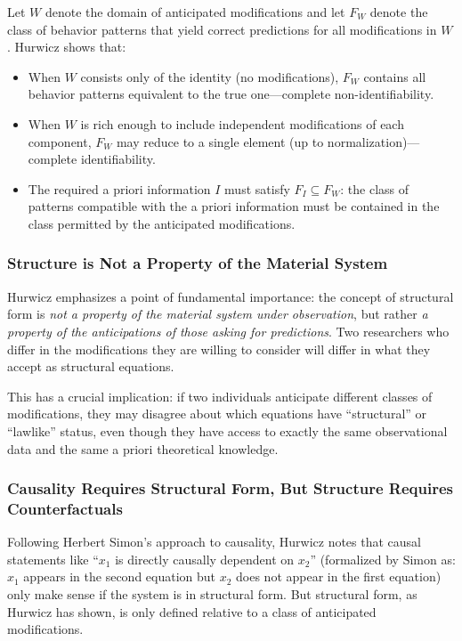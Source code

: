 \documentclass[12pt]{article}
\begin{document}
Let $W$ denote the domain of anticipated modifications and let $F_W$ denote the class of behavior patterns that yield correct predictions for all modifications in $W$. Hurwicz shows that:
\begin{itemize}
\item When $W$ consists only of the identity (no modifications), $F_W$ contains all behavior patterns equivalent to the true one---complete non-identifiability.
\item When $W$ is rich enough to include independent modifications of each component, $F_W$ may reduce to a single element (up to normalization)---complete identifiability.
\item The required a priori information $I$ must satisfy $F_I \subseteq F_W$: the class of patterns compatible with the a priori information must be contained in the class permitted by the anticipated modifications.
\end{itemize}

\subsubsection{Structure is Not a Property of the Material System}

Hurwicz emphasizes a point of fundamental importance: the concept of structural form is \emph{not a property of the material system under observation}, but rather \emph{a property of the anticipations of those asking for predictions}. Two researchers who differ in the modifications they are willing to consider will differ in what they accept as structural equations.

This has a crucial implication: if two individuals anticipate different classes of modifications, they may disagree about which equations have ``structural'' or ``lawlike'' status, even though they have access to exactly the same observational data and the same a priori theoretical knowledge.

\subsubsection{Causality Requires Structural Form, But Structure Requires Counterfactuals}

Following Herbert Simon's approach to causality, Hurwicz notes that causal statements like ``$x_1$ is directly causally dependent on $x_2$'' (formalized by Simon as: $x_1$ appears in the second equation but $x_2$ does not appear in the first equation) only make sense if the system is in structural form. But structural form, as Hurwicz has shown, is only defined relative to a class of anticipated modifications.
\end{document}
